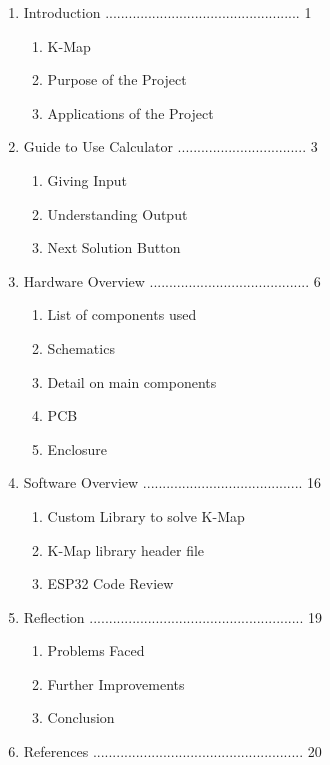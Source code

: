 \documentclass[12pt,a4paper]{article}
\begin{document}
\begin{enumerate}[label=\arabic*.]
    \item Introduction .................................................. 1
        \begin{enumerate}[label*=\arabic*.]
                \item K-Map 
                \item Purpose of the Project 
                \item Applications of the Project
        \end{enumerate}
    \item Guide to Use Calculator ................................. 3
        \begin{enumerate}[label*=\arabic*.]
                \item Giving Input
                \item Understanding Output
                \item Next Solution Button
        \end{enumerate}
    \item Hardware Overview ......................................... 6
           \begin{enumerate}[label*=\arabic*.]
                \item List of components used
                \item Schematics
                \item Detail on main components
                \item PCB
                \item Enclosure
        \end{enumerate}
    \item Software Overview ......................................... 16
            \begin{enumerate}[label*=\arabic*.]
                \item Custom Library to solve K-Map
                \item K-Map library header file
                \item ESP32 Code Review
        \end{enumerate}

    \item Reflection ....................................................... 19
            \begin{enumerate}[label*=\arabic*.]
                \item Problems Faced
                \item Further Improvements
                \item Conclusion
        \end{enumerate}
    \item References ...................................................... 20
        
\end{enumerate}
\vspace{2em}
\end{document}
